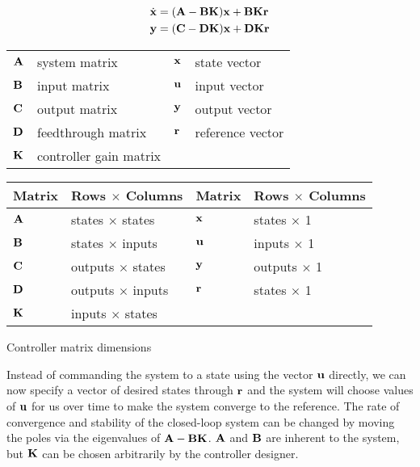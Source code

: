 \begin{theorem}
  \begin{align}
    \dot{\mathbf{x}} &= (\mathbf{A} - \mathbf{B}\mathbf{K})\mathbf{x} + \mathbf{B}\mathbf{K}\mathbf{r}
      \label{eq:s_ref_ctrl_x} \\
    \mathbf{y} &= (\mathbf{C} - \mathbf{D}\mathbf{K})\mathbf{x} + \mathbf{D}\mathbf{K}\mathbf{r}
      \label{eq:s_ref_ctrl_y}
  \end{align}

  \begin{figurekey}
    \begin{tabulary}{\linewidth}{LLLL}
      $\mathbf{A}$ & system matrix      & $\mathbf{x}$ & state vector \\
      $\mathbf{B}$ & input matrix       & $\mathbf{u}$ & input vector \\
      $\mathbf{C}$ & output matrix      & $\mathbf{y}$ & output vector \\
      $\mathbf{D}$ & feedthrough matrix & $\mathbf{r}$ & \gls{reference} vector \\
      $\mathbf{K}$ & controller gain matrix &  &  \\
    \end{tabulary}
  \end{figurekey}
\end{theorem}

\begin{booktable}
  \begin{tabular}{|ll|ll|}
    \hline
    \rowcolor{headingbg}
    \textbf{Matrix} & \textbf{Rows $\times$ Columns} &
    \textbf{Matrix} & \textbf{Rows $\times$ Columns} \\
    \hline
    $\mathbf{A}$ & states $\times$ states & $\mathbf{x}$ & states $\times$ 1 \\
    $\mathbf{B}$ & states $\times$ inputs & $\mathbf{u}$ & inputs $\times$ 1 \\
    $\mathbf{C}$ & outputs $\times$ states & $\mathbf{y}$ & outputs $\times$ 1 \\
    $\mathbf{D}$ & outputs $\times$ inputs & $\mathbf{r}$ & states $\times$ 1 \\
    $\mathbf{K}$ & inputs $\times$ states &  &  \\
    \hline
  \end{tabular}
  \caption{Controller matrix dimensions}
  \label{tab:ctrl_matrix_dims}
\end{booktable}

Instead of commanding the system to a state using the vector $\mathbf{u}$ directly,
we can now specify a vector of desired states through $\mathbf{r}$ and the system
will choose values of $\mathbf{u}$ for us over time to make the system converge to
the reference. The rate of convergence and stability of the closed-loop system
can be changed by moving the poles via the eigenvalues of $\mathbf{A} -
\mathbf{B}\mathbf{K}$. $\mathbf{A}$ and $\mathbf{B}$ are inherent to the system, but
$\mathbf{K}$ can be chosen arbitrarily by the controller designer.

